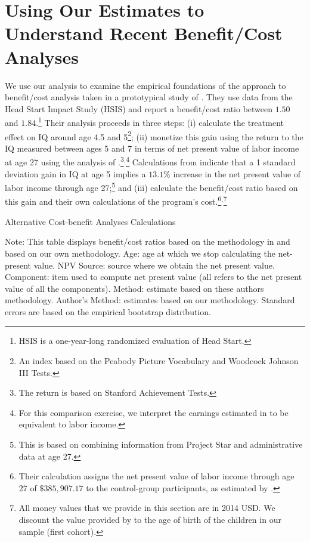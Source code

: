\section{Using Our Estimates to Understand Recent Benefit/Cost Analyses}\label{appendix:bcaestimates}

We use our analysis to examine the empirical foundations of the approach to benefit/cost analysis taken in a prototypical study of \citet{Kline_Walters_2016_QJE}. They use data from the Head Start Impact Study (HSIS) and report a benefit/cost ratio between $1.50$ and $1.84$.\footnote{HSIS is a one-year-long randomized evaluation of Head Start.} Their analysis proceeds in three steps: (i) calculate the treatment effect on IQ around age 4.5 and 5\footnote{An index based on the Peabody Picture Vocabulary and Woodcock Johnson III Tests.}; (ii) monetize this gain using the return to the IQ measured between ages 5 and 7 in terms of net present value of labor income at age 27 using the analysis of \citet{Chetty_Friedman_etal_2011_QJoE}.\footnote{The \citet{Chetty_Friedman_etal_2011_QJoE} return is based on Stanford Achievement Tests.}$^,$\footnote{For this comparison exercise, we interpret the earnings estimated in \citet{Chetty_Friedman_etal_2011_QJoE} to be equivalent to labor income.} Calculations from \citet{Chetty_Friedman_etal_2011_QJoE} indicate that a 1 standard deviation gain in IQ at age 5 implies a $13.1\%$ increase in the net present value of labor income through age 27;\footnote{This is based on combining information from Project Star and administrative data at age 27.} and (iii) calculate the benefit/cost ratio based on this gain and their own calculations of the program's cost.\footnote{Their calculation assigns the net present value of labor income through age 27 of $\$385,907.17$ to the control-group participants, as estimated by  \citet{Chetty_Friedman_etal_2011_QJoE}.}$^,$\footnote{All money values that we provide in this section are in 2014 USD. We discount the value provided by \citet{Chetty_Friedman_etal_2011_QJoE} to the age of birth of the children in our sample (first cohort).}


\begin{table}[!htbp]
\begin{threeparttable}
\caption{Alternative Cost-benefit Analyses Calculations}
\label{table:comparing}
\centering
\footnotesize

\begin{tablenotes}
\footnotesize
\item Note: This table displays benefit/cost ratios based on the methodology in \citet{Kline_Walters_2016_QJE} and based on our own methodology. Age: age at which we stop calculating the net-present value. NPV Source: source where we obtain the net present value. Component: item used to compute net present value (all refers to the net present value of all the components). \citet{Kline_Walters_2016_QJE} Method: estimate based on these authors methodology. Author's Method: estimates based on our methodology. Standard errors are based on the empirical bootstrap distribution.
\end{tablenotes}
\end{threeparttable}
\end{table}

